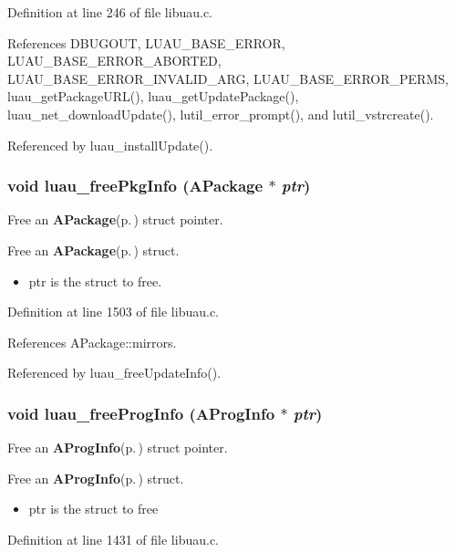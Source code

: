 Definition at line 246 of file libuau.c.

References DBUGOUT, LUAU\_\-BASE\_\-ERROR, LUAU\_\-BASE\_\-ERROR\_\-ABORTED, LUAU\_\-BASE\_\-ERROR\_\-INVALID\_\-ARG, LUAU\_\-BASE\_\-ERROR\_\-PERMS, luau\_\-get\-Package\-URL(), luau\_\-get\-Update\-Package(), luau\_\-net\_\-download\-Update(), lutil\_\-error\_\-prompt(), and lutil\_\-vstrcreate().

Referenced by luau\_\-install\-Update().
\subsubsection{\setlength{\rightskip}{0pt plus 5cm}void luau\_\-free\-Pkg\-Info ({\bf APackage} $\ast$ {\em ptr})}\label{libuau_8c_a53}


Free an {\bf APackage}{\rm (p.\,\pageref{structAPackage})} struct pointer. 

Free an {\bf APackage}{\rm (p.\,\pageref{structAPackage})} struct.

\begin{itemize}
\item ptr is the struct to free. \end{itemize}


Definition at line 1503 of file libuau.c.

References APackage::mirrors.

Referenced by luau\_\-free\-Update\-Info().
\subsubsection{\setlength{\rightskip}{0pt plus 5cm}void luau\_\-free\-Prog\-Info ({\bf AProg\-Info} $\ast$ {\em ptr})}\label{libuau_8c_a51}


Free an {\bf AProg\-Info}{\rm (p.\,\pageref{structAProgInfo})} struct pointer. 

Free an {\bf AProg\-Info}{\rm (p.\,\pageref{structAProgInfo})} struct.

\begin{itemize}
\item ptr is the struct to free \end{itemize}


Definition at line 1431 of file libuau.c.

